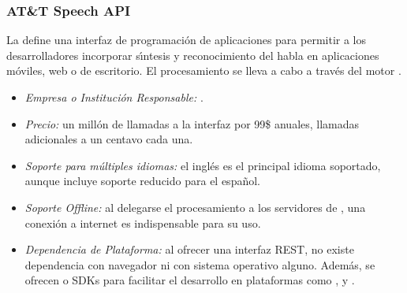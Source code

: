 \subsubsection{AT\&T Speech API}
\label{sec:att}

La  \cite{AttSpeech} define una interfaz de programaci\'on de aplicaciones para permitir
a los desarrolladores incorporar s{\'\i}ntesis y reconocimiento del habla en aplicaciones m\'oviles,
web o de escritorio. El procesamiento se lleva a cabo a trav\'es del motor .

\begin{itemize}
	\item \emph{Empresa o Instituci\'on Responsable:} .
	\item \emph{Precio:} un mill\'on de llamadas a la interfaz por 99\$ anuales, llamadas adicionales a un centavo
	cada una.
	\item \emph{Soporte para m\'ultiples idiomas:} el ingl\'es es el principal idioma soportado, aunque incluye
	soporte reducido para el espa\~nol.
	\item \emph{Soporte Offline:} al delegarse el procesamiento a los servidores de ,
	una conexi\'on a internet es indispensable para su uso.
	\item \emph{Dependencia de Plataforma:} al ofrecer una interfaz REST, no existe dependencia con navegador
	ni con sistema operativo alguno. Adem\'as, se ofrecen  o SDKs para facilitar
	el desarrollo en plataformas como ,  y .
\end{itemize}
